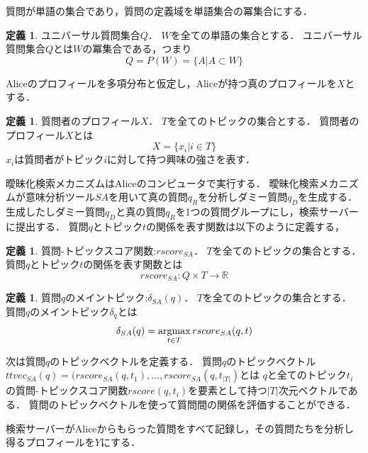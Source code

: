 \documentclass[master]{suribt}
\theoremstyle{definition}
\newtheorem{defi}[thm]{定義}
\newcommand{\argmax}{\mathop{\rm argmax}\limits}
\begin{document}
 質問が単語の集合であり，質問の定義域を単語集合の冪集合にする．
 
 \begin{defi}{ユニバーサル質問集合$Q$．}
  $W$を全ての単語の集合とする．
  ユニバーサル質問集合$Q$とは$W$の冪集合である，つまり
  \begin{equation}
  Q = P(W) = \{A|A \subset W\}
  \end{equation}
 \end{defi}
 Aliceのプロフィールを多項分布と仮定し，Aliceが持つ真のプロフィールを$X$とする．
 
 \begin{defi}{質問者のプロフィール$X$．}
  $T$を全てのトピックの集合とする．
  質問者のプロフィール$X$とは
  \begin{equation}
   X = \{x_i| i \in T\}
  \end{equation}
  $x_i$は質問者がトピック$i$に対して持つ興味の強さを表す．
 \end{defi}
 曖昧化検索メカニズムはAliceのコンピュータで実行する．
 曖昧化検索メカニズムが意味分析ツール$SA$を用いて真の質問$q_R$を分析しダミー質問$q_D$を生成する．
 生成したしダミー質問$q_D$と真の質問$q_R$を1つの質問グループにし，検索サーバーに提出する．
 質問$q$とトピック$t$の関係を表す関数は以下のように定義する，
 
 \begin{defi}{質問-トピックスコア関数:$rscore_{SA}$．}
  $T$を全てのトピックの集合とする．
  質問$q$とトピック$t$の関係を表す関数とは
  \begin{equation}
   rscore_{SA}:Q \times T \to \mathbb{R}
  \end{equation}
 \end{defi}

 \begin{defi}{質問$q$のメイントピック:$\delta_{SA}(q)$．}
  $T$を全てのトピックの集合とする．
  質問$q$のメイントピック$\delta_q$とは
  \begin{equation}
   \delta_{SA}(q) = \argmax_{t \in T} rscore_{SA}(q,t)
  \end{equation}
 \end{defi}

 次は質問$q$のトピックベクトルを定義する．
 質問$q$のトピックベクトル$ttvec_{SA}(q) = (rscore_{SA}(q,t_1 ), \dots , rscore_{SA}(q,t_{|T|})$とは
 $q$と全てのトピック$t_i$の質問-トピックスコア関数$rscore(q, t_i)$を要素として持つ$|T|$次元ベクトルである．
 質問のトピックベクトルを使って質問間の関係を評価することができる．

 検索サーバーがAliceからもらった質問をすべて記録し，その質問たちを分析し得るプロフィールを$Y$にする．
\end{document}
